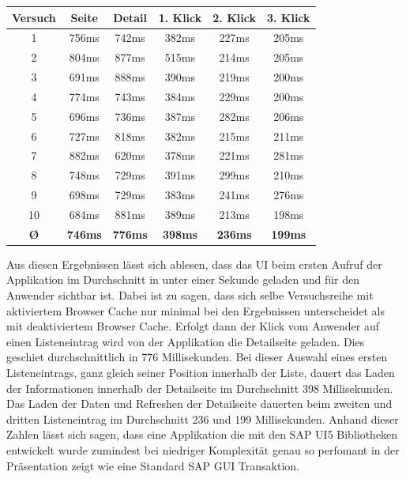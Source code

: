 \vspace{1em}
\begin{center}
  \begin{tabular}{ | c | c | c | c | c | c | }
    \hline
    \textbf{Versuch}
    & \textbf{Seite} & \textbf{Detail} & \textbf{1. Klick} & \textbf{2. Klick} & \textbf{3. Klick}\\
    \hline \hline
    1 & 756ms & 742ms & 382ms & 227ms & 205ms\\
    \hline
    2 & 804ms & 877ms & 515ms & 214ms & 205ms\\
    \hline
    3 & 691ms & 888ms & 390ms & 219ms & 200ms\\
    \hline
    4 & 774ms & 743ms & 384ms & 229ms & 200ms\\
    \hline
    5 & 696ms & 736ms & 387ms & 282ms & 206ms\\
    \hline
    6 & 727ms & 818ms & 382ms & 215ms & 211ms\\
    \hline
    7 & 882ms & 620ms & 378ms & 221ms & 281ms\\
    \hline
    8 & 748ms & 729ms & 391ms & 299ms & 210ms\\
    \hline
    9 & 698ms & 729ms & 383ms & 241ms & 276ms\\
    \hline
    10 & 684ms & 881ms & 389ms & 213ms & 198ms\\
    \hline \hline
    \textbf{\O} & \textbf{746ms} & \textbf{776ms} & \textbf{398ms} & \textbf{236ms} & \textbf{199ms}\\
    \hline
  \end{tabular}
\label{tab:uiloading}
\end{center}

Aus diesen Ergebnissen lässt sich ablesen, dass das UI beim ersten Aufruf der Applikation im Durchschnitt in unter einer Sekunde geladen und für den Anwender sichtbar ist. Dabei ist zu sagen, dass sich selbe Versuchsreihe mit aktiviertem Browser Cache nur minimal bei den Ergebnissen unterscheidet als mit deaktiviertem Browser Cache. Erfolgt dann der Klick vom Anwender auf einen Listeneintrag wird von der Applikation die Detailseite geladen. Dies geschiet durchschnittlich in 776 Millisekunden. Bei dieser Auswahl eines ersten Listeneintrags, ganz gleich seiner Position innerhalb der Liste, dauert das Laden der Informationen innerhalb der Detailseite im Durchschnitt 398 Millisekunden. Das Laden der Daten und Refreshen der Detailseite dauerten beim zweiten und dritten Listeneintrag im Durchschnitt 236 und 199 Millisekunden. Anhand dieser Zahlen lässt sich sagen, dass eine Applikation die mit den SAP UI5 Bibliotheken entwickelt wurde zumindest bei niedriger Komplexität genau so perfomant in der Präsentation zeigt wie eine Standard SAP GUI Transaktion.
